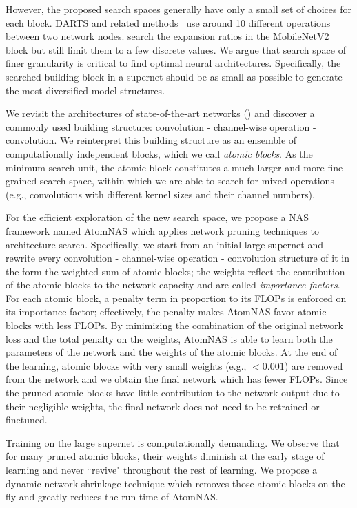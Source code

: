 \documentclass{article} \usepackage{iclr2020_conference,times}
\begin{document}
However, the proposed search spaces generally have only a small set of choices for each block. DARTS and related methods~\citep{hanxiao2019darts,chen2019pdarts, liang2019dartsplus} use around 10 different operations between two network nodes. \cite{howard2019mobilenetv3,han2019proxyless,wu2019fbnet,stamoulis2019single_path} search the expansion ratios in the MobileNetV2 block but still limit them to a few discrete values. We argue that search space of finer granularity is critical to find optimal neural architectures. Specifically, the searched building block in a supernet should be as small as possible to generate the most diversified model structures.


We revisit the architectures of state-of-the-art networks (\cite{howard2019mobilenetv3,tan2019mixnet,he2016resnet}) and discover a commonly used building structure: convolution - channel-wise operation - convolution. We reinterpret this building structure as an ensemble of computationally independent blocks, which we call \textit{atomic blocks}. 
As the minimum search unit, the atomic block constitutes a much larger and more fine-grained search space, within which we are able to search for mixed operations (e.g., convolutions with different kernel sizes and their channel numbers).


For the efficient exploration of the new search space, we propose a NAS framework named AtomNAS which applies network pruning techniques to architecture search.
Specifically, we start from an initial large supernet and rewrite every convolution - channel-wise operation - convolution structure of it in the form the weighted sum of atomic blocks; the weights reflect the contribution of the atomic blocks to the network capacity and are called \textit{importance factors}. For each atomic block, a penalty term in proportion to its FLOPs is enforced on its importance factor; effectively, the penalty makes AtomNAS favor atomic blocks with less FLOPs. By minimizing the combination of the original network loss and the total penalty on the weights, AtomNAS is able to learn both the parameters of the network and the weights of the atomic blocks. At the end of the learning, atomic blocks with very small weights (e.g., $<0.001$) are removed from the network and we obtain the final network which has fewer FLOPs. Since the pruned atomic blocks have little contribution to the network output due to their negligible weights, the final network does not need to be retrained or finetuned.

Training on the large supernet is computationally demanding. We observe that for many pruned atomic blocks, their weights diminish at the early stage of learning and never ``revive" throughout the rest of learning. We propose a dynamic network shrinkage technique which removes those atomic blocks on the fly and greatly reduces the run time of AtomNAS.
\end{document}
